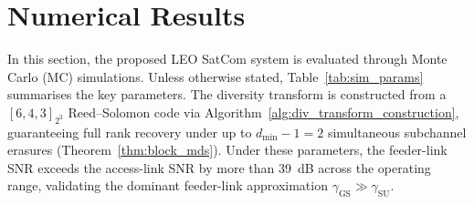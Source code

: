 \documentclass[lettersize,journal]{IEEEtran}
\begin{document}
\section{Numerical Results}
\label{sec:results}
In this section, the proposed LEO SatCom system is evaluated through Monte Carlo (MC)
  simulations. Unless otherwise stated, Table~\ref{tab:sim_params}
  summarises the key parameters. The diversity transform is
  constructed from a $[6, 4, 3]_{2^3}$ Reed--Solomon code via
  Algorithm~\ref{alg:div_transform_construction}, guaranteeing
  full rank recovery under up to $d_{\min} - 1 = 2$ simultaneous
  subchannel erasures (Theorem~\ref{thm:block_mds}). Under these
  parameters, the feeder-link SNR exceeds the access-link SNR by
  more than 39~dB across the operating range, validating the
  dominant feeder-link approximation
  $\gamma_{\mathrm{GS}} \gg \gamma_{\mathrm{SU}}$.
\end{document}
